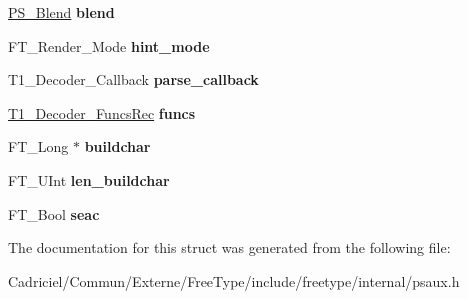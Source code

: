 \begin{DoxyCompactItemize}
\item 
\hypertarget{struct_t1___decoder_rec___a0cd698c7041cb4f319949b62f215f7c7}{\hyperlink{struct_p_s___blend_rec__}{P\-S\-\_\-\-Blend} {\bfseries blend}}\label{struct_t1___decoder_rec___a0cd698c7041cb4f319949b62f215f7c7}

\item 
\hypertarget{struct_t1___decoder_rec___a364b15149edb573dcc79be015eba61b4}{F\-T\-\_\-\-Render\-\_\-\-Mode {\bfseries hint\-\_\-mode}}\label{struct_t1___decoder_rec___a364b15149edb573dcc79be015eba61b4}

\item 
\hypertarget{struct_t1___decoder_rec___a840af0b01e7adb1e3aa521a936196b62}{T1\-\_\-\-Decoder\-\_\-\-Callback {\bfseries parse\-\_\-callback}}\label{struct_t1___decoder_rec___a840af0b01e7adb1e3aa521a936196b62}

\item 
\hypertarget{struct_t1___decoder_rec___a6b0f5f7cb3f44e88880aa9c927d79775}{\hyperlink{struct_t1___decoder___funcs_rec__}{T1\-\_\-\-Decoder\-\_\-\-Funcs\-Rec} {\bfseries funcs}}\label{struct_t1___decoder_rec___a6b0f5f7cb3f44e88880aa9c927d79775}

\item 
\hypertarget{struct_t1___decoder_rec___a967ee06cbbdc8823be8f95df5db625b9}{F\-T\-\_\-\-Long $\ast$ {\bfseries buildchar}}\label{struct_t1___decoder_rec___a967ee06cbbdc8823be8f95df5db625b9}

\item 
\hypertarget{struct_t1___decoder_rec___a55fd1c88d6f7badaec2aa13db17c816f}{F\-T\-\_\-\-U\-Int {\bfseries len\-\_\-buildchar}}\label{struct_t1___decoder_rec___a55fd1c88d6f7badaec2aa13db17c816f}

\item 
\hypertarget{struct_t1___decoder_rec___a45bf18b54ff973177ea3061ef0b705c6}{F\-T\-\_\-\-Bool {\bfseries seac}}\label{struct_t1___decoder_rec___a45bf18b54ff973177ea3061ef0b705c6}

\end{DoxyCompactItemize}


The documentation for this struct was generated from the following file\-:\begin{DoxyCompactItemize}
\item 
Cadriciel/\-Commun/\-Externe/\-Free\-Type/include/freetype/internal/psaux.\-h\end{DoxyCompactItemize}
